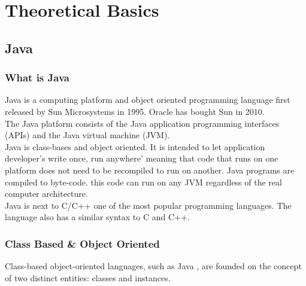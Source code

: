 \chapter{Theoretical Basics} \label{chapter:basics}
\section{Java}
\subsection{What is Java}
Java is a computing platform and object oriented programming language first released by Sun Microsystems in 1995. Oracle has bought Sun in 2010.\cite{JavaWhat}
\\



The Java platform consists of the Java application programming interfaces (APIs) and the Java virtual machine (JVM).
\\



Java is class-bases and object oriented. It is intended to let application developer's write once, run anywhere' meaning that code that runs on one platform does not need to be recompiled to run on another. Java programs are compiled to byte-code. this code can run on any JVM regardless of the real computer architecture.\cite{javaWiki}
\\

Java is next to C/C++ one of the most popular programming languages.\cite{progLangPop} The language also has a similar syntax to C and C++.

\subsection{Class Based \& Object Oriented}
Class-based object-oriented languages, such as Java , are founded on the concept of two distinct entities: classes and instances.

